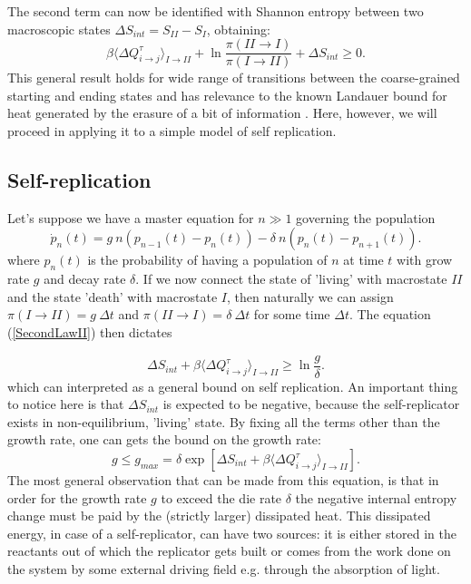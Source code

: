 \documentclass[a4paper,12pt]{article}
\begin{document}
The second term can now be identified with Shannon entropy between two macroscopic states $\Delta S_{int} = S_{II}- S_{I}$, obtaining:
\begin{equation}
\label{SecondLawII}
  \beta \langle\Delta Q_{i\to j}^{\tau} \rangle_{I \to II} + \ln{\frac{\pi(II \to I)}{\pi(I \to II)}} +\Delta S_{int}  \geq 0.
\end{equation}
This general result holds for wide range of transitions between the coarse-grained starting and ending states and has relevance to the known Landauer bound for heat generated by the erasure of a bit of information \cite{England:2013ed}. Here, however, we will proceed in applying it to a simple model of self replication.

\subsection{Self-replication}

Let's suppose we have a master equation for $n \gg 1$ governing the population
\begin{equation}
  \dot{p}_n(t)=g\ n\left(p_{n-1}(t)-p_n(t)\right)-\delta\ n\left(p_n(t)-p_{n+1}(t)\right).
\end{equation}
where $p_n(t)$ is the probability of having a population of $n$ at time $t$ with grow rate $g$ and decay rate $\delta $.
If we now connect the state of 'living' with macrostate $II$ and the state 'death' with macrostate $I$, then naturally we can assign $\pi (I \to II) = g\ \Delta t$ and $\pi (II \to I) = \delta\ \Delta t$ for some time $\Delta t$.
The equation (\ref{SecondLawII}) then dictates

\begin{equation}
  \Delta S_{int} + \beta \langle \Delta Q_{i\to j}^{\tau}  \rangle_{I \to II} \geq \ln{\frac{g}{\delta}}.
\end{equation}
which can interpreted as a general bound on self replication.
An important thing to notice here is that $\Delta S_{int}$ is expected to be negative, because the self-replicator exists in non-equilibrium, 'living' state.
By fixing all the terms other than the growth rate, one can gets the bound on the growth rate:
\begin{equation}
  g \leq g_{max}=\delta \exp[ \Delta S_{int} + \beta \langle \Delta Q_{i\to j}^{\tau}  \rangle_{I \to II}].
\end{equation}
The most general observation that can be made from this equation, is that in order for the growth rate $g$ to exceed the die rate $\delta $ the negative internal entropy change must be paid by the (strictly larger) dissipated heat. This dissipated energy, in case of a self-replicator, can have two sources: it is either stored in the reactants out of which the replicator gets built or comes from the work done on the system by some external driving field e.g. through the absorption of light.
\end{document}
